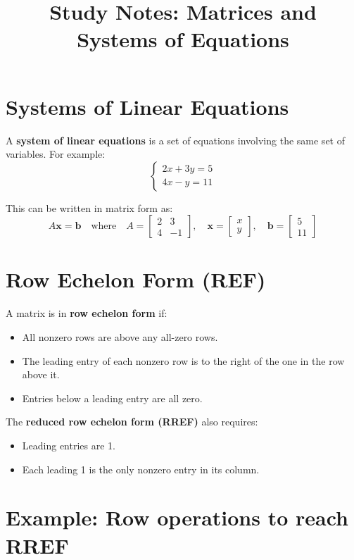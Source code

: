 \documentclass[12pt]{article}
\title{Study Notes: Matrices and Systems of Equations}
\author{}
\date{}
\begin{document}
	\maketitle
	
	\section{Systems of Linear Equations}
	A \textbf{system of linear equations} is a set of equations involving the same set of variables. For example:
	\[
	\begin{cases}
		2x + 3y = 5 \\
		4x - y = 11
	\end{cases}
	\]
	
	This can be written in matrix form as:
	\[
	A\mathbf{x} = \mathbf{b}
	\quad \text{where} \quad
	A = \begin{bmatrix}
		2 & 3 \\
		4 & -1
	\end{bmatrix}, \quad
	\mathbf{x} = \begin{bmatrix}
		x \\
		y
	\end{bmatrix}, \quad
	\mathbf{b} = \begin{bmatrix}
		5 \\
		11
	\end{bmatrix}
	\]
	
	\section{Row Echelon Form (REF)}
	A matrix is in \textbf{row echelon form} if:
	\begin{itemize}
		\item All nonzero rows are above any all-zero rows.
		\item The leading entry of each nonzero row is to the right of the one in the row above it.
		\item Entries below a leading entry are all zero.
	\end{itemize}
	
	The \textbf{reduced row echelon form (RREF)} also requires:
	\begin{itemize}
		\item Leading entries are 1.
		\item Each leading 1 is the only nonzero entry in its column.
	\end{itemize}
	
	\section*{Example: Row operations to reach RREF}
	
\end{document}
